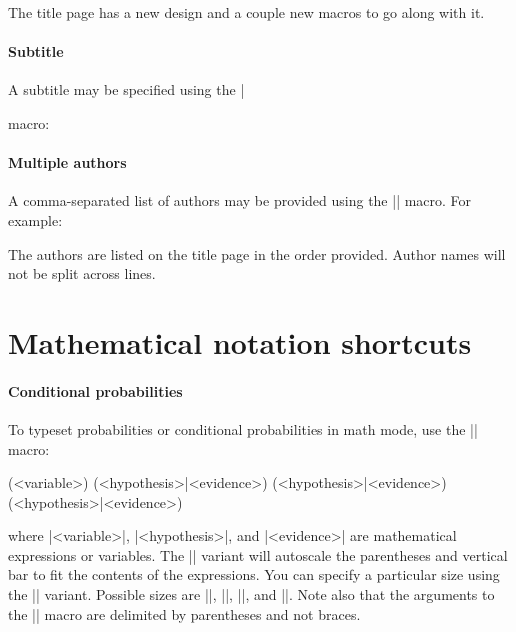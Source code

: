 \documentclass{bayeshyp}
\begin{document}
The title page has a new design and a couple new macros to go along with it.

\paragraph{Subtitle}

A subtitle may be specified using the \syn|\subtitle| macro:

\begin{syntax}
  \subtitle{Examples for Students}
\end{syntax}

\paragraph{Multiple authors}

A comma-separated list of authors may be provided using the \syn|\authors| macro. For example:
\begin{syntax}
\end{syntax}

The authors are listed on the title page in the order provided.
Author names will not be split across lines.


\section{Mathematical notation shortcuts}

\paragraph{Conditional probabilities}
To typeset probabilities or conditional probabilities in math mode, use the \syn|\p| macro:
\begin{syntax}
  \p(<variable>)
  \p(<hypothesis>|<evidence>)
  \p*(<hypothesis>|<evidence>)
  \p[<size>](<hypothesis>|<evidence>)
\end{syntax}
where \syn|<variable>|, \syn|<hypothesis>|, and \syn|<evidence>| are mathematical expressions or variables.
The \syn|\p*| variant will autoscale the parentheses and vertical bar to fit the contents of the expressions.
You can specify a particular size using the \syn|\p[<size>]| variant.
Possible sizes are \syn|\big|, \syn|\Big|, \syn|\bigg|, and \syn|\Bigg|.
Note also that the arguments to the \syn|\p| macro are delimited by parentheses and not braces.
\end{document}
